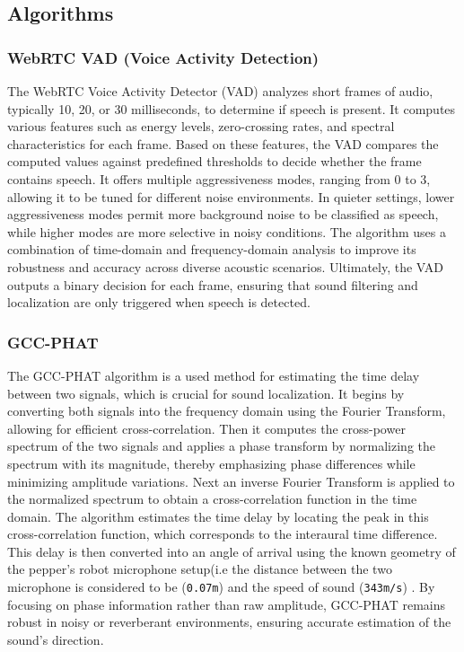 \documentclass{CSSRforAfrica}
\begin{document}
\subsection*{Algorithms}
\subsubsection*{WebRTC VAD (Voice Activity Detection)}
The WebRTC Voice Activity Detector (VAD) analyzes short frames of audio, typically 10, 20, or 30 milliseconds, to determine if speech is present. It computes various features such as energy levels, zero-crossing rates, and spectral characteristics for each frame. Based on these features, the VAD compares the computed values against predefined thresholds to decide whether the frame contains speech. It offers multiple aggressiveness modes, ranging from 0 to 3, allowing it to be tuned for different noise environments. In quieter settings, lower aggressiveness modes permit more background noise to be classified as speech, while higher modes are more selective in noisy conditions. The algorithm uses a combination of time-domain and frequency-domain analysis to improve its robustness and accuracy across diverse acoustic scenarios. Ultimately, the VAD outputs a binary decision for each frame, ensuring that sound filtering and localization are only triggered when speech is detected.\cite{webrtcvad}

\subsubsection*{GCC-PHAT}
The GCC-PHAT algorithm is a used method for estimating the time delay between two signals, which is crucial for sound localization. It begins by converting both signals into the frequency domain using the Fourier Transform, allowing for efficient cross-correlation. Then it computes the cross-power spectrum of the two signals and applies a phase transform by normalizing the spectrum with its magnitude, thereby emphasizing phase differences while minimizing amplitude variations. Next an inverse Fourier Transform is applied to the normalized spectrum to obtain a cross-correlation function in the time domain. The algorithm estimates the time delay by locating the peak in this cross-correlation function, which corresponds to the interaural time difference. This delay is then converted into an angle of arrival using the known geometry of the pepper's robot microphone setup(i.e the distance between the two microphone is considered to be (\texttt{0.07m}) and the speed of sound (\texttt{343m/s}) . By focusing on phase information rather than raw amplitude, GCC-PHAT remains robust in noisy or reverberant environments, ensuring accurate estimation of the sound's direction.\cite{knapp1976generalized}
\end{document}
